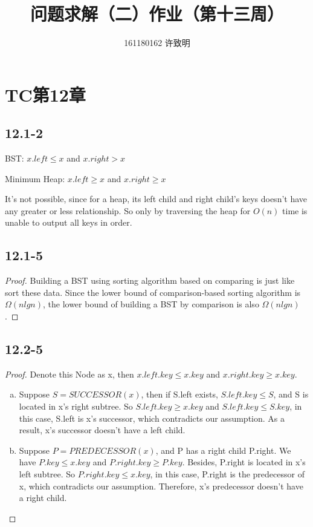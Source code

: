 \documentclass[twocolumn]{article}
\begin{document}
	\title{问题求解（二）作业（第十三周）}\author{161180162 许致明}\maketitle
	\section*{TC第12章}
	\subsection*{12.1-2}
	BST: $x.left\leq x$ and $x.right>x$\par
	Minimum Heap: $x.left\geq x$ and $x.right\geq x$\par 
	It's not possible, since for a heap, its left child and right child's keys doesn't have any greater or less relationship. So only by traversing the heap for $O(n)$ time is unable to output all keys in order.
	\subsection*{12.1-5}
	\begin{proof}
		Building a BST using sorting algorithm based on comparing is just like sort these data. Since the lower bound of comparison-based sorting algorithm is $\Omega(nlgn)$, the lower bound of building a BST by comparison is also $\Omega(nlgn)$.
	\end{proof}
	\subsection*{12.2-5}
	\begin{proof}
		Denote this Node as x, then $x.left.key\leq x.key$ and $x.right.key\geq x.key$.\par
		\begin{enumerate}[a.]
		\item Suppose $S=SUCCESSOR(x)$, then if S.left exists, $S.left.key\leq S$, and S is located in x's right subtree. So $S.left.key\geq x.key$ and $S.left.key\leq S.key$, in this case, S.left is x's successor, which contradicts our assumption. As a result, x's successor doesn't have a left child.
		\item Suppose $P=PREDECESSOR(x)$, and P has a right child P.right. We have $P.key\leq x.key$ and $P.right.key\geq P.key$. Besides, P.right is located in x's left subtree. So $P.right.key\leq x.key$, in this case, P.right is the predecessor of x, which contradicts our assumption. Therefore, x's predecessor doesn't have a right child.
		\end{enumerate}
	\end{proof}
\end{document}
